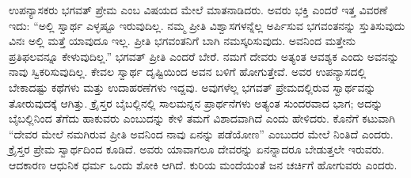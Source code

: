  ಉಪನ್ಯಾಸಕರು ಭಗವತ್ ಪ್ರೇಮ ಎಂಬ ವಿಷಯದ ಮೇಲೆ ಮಾತನಾಡಿದರು. ಅವರು ಭಕ್ತಿ ಎಂದರೆ ಇತ್ತ ವಿವರಣೆ ಇದು: “ಅಲ್ಲಿ ಸ್ವಾರ್ಥ ಎಳ್ಳಷ್ಟೂ ಇರುವುದಿಲ್ಲ. ನಮ್ಮ ಪ್ರೀತಿ ವಿಶ್ವಾಸಗಳನ್ನೆಲ್ಲ ಅರ್ಪಿಸುವ ಭಗವಂತನನ್ನು ಸ್ತುತಿಸುವುದು ವಿನಃ ಅಲ್ಲಿ ಮತ್ತೆ ಯಾವುದೂ ಇಲ್ಲ. ಪ್ರೀತಿ ಭಗವಂತನಿಗೆ ಬಾಗಿ ನಮಸ್ಕರಿಸುವುದು. ಅವನಿಂದ ಮತ್ತೇನು ಪ್ರತಿಫಲವನ್ನೂ ಕೇಳುವುದಿಲ್ಲ.” ಭಗವತ್ ಪ್ರೀತಿ ಎಂದರೆ ಬೇರೆ. ನಮಗೆ ದೇವರು ಅತ್ಯಂತ ಆವಶ್ಯಕ ಎಂದು ಅವನನ್ನು ನಾವು ಸ್ವಿಕರಿಸುವುದಿಲ್ಲ. ಕೇವಲ ಸ್ವಾರ್ಥ ದೃಷ್ಟಿಯಿಂದ ಅವನ ಬಳಿಗೆ ಹೋಗುತ್ತೇವೆ. ಅವರ ಉಪನ್ಯಾಸದಲ್ಲಿ ಬೇಕಾದಷ್ಟು ಕಥೆಗಳು ಮತ್ತು ಉದಾಹರಣೆಗಳು ಇದ್ದವು. ಅವುಗಳೆಲ್ಲ ಭಗವತ್ ಪ್ರೇಮದಲ್ಲಿರುವ ಸ್ವಾರ್ಥವನ್ನು ತೋರುವುದಕ್ಕೆ ಆಗಿತ್ತು. ಕ್ರೈಸ್ತರ ಬೈಬಲ್ಲಿನಲ್ಲಿ ಸಾಲಮನ್ನನ ಪ್ರಾರ್ಥನೆಗಳು ಅತ್ಯಂತ ಸುಂದರವಾದ ಭಾಗ; ಅದನ್ನು ಬೈಬಲ್ಲಿನಿಂದ ತೆಗೆದು ಹಾಕುವರು ಎಂಬುದನ್ನು ಕೇಳಿ ತಮಗೆ ವಿಶಾದವಾಗಿದೆ ಎಂದು ಹೇಳಿದರು. ಕೊನೆಗೆ ಕಟುವಾಗಿ “ದೇವರ ಮೇಲೆ ನಮಗಿರುವ ಪ್ರೀತಿ ಅವನಿಂದ ನಾವು ಏನನ್ನು ಪಡೆಯೋಣ” ಎಂಬುದರ ಮೇಲೆ ನಿಂತಿದೆ ಎಂದರು. ಕ್ರೈಸ್ತರ ಪ್ರೇಮ ಸ್ವಾರ್ಥದಿಂದ ಕೂಡಿದೆ. ಅವರು ಯಾವಾಗಲೂ ದೇವರನ್ನು ಏನನ್ನಾದರೂ ಬೇಡುತ್ತಲೇ ಇರುವರು. ಆದಕಾರಣ ಆಧುನಿಕ ಧರ್ಮ ಒಂದು ಶೋಕಿ ಆಗಿದೆ. ಕುರಿಯ ಮಂದೆಯಂತೆ ಜನ ಚರ್ಚಿಗೆ ಹೋಗುವರು ಎಂದರು.

